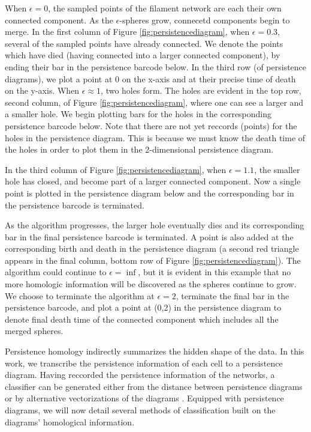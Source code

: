 \documentclass[10pt]{article}
\begin{document}
When $\epsilon=0$, the sampled points of the filament network are each their own connected component. As the $\epsilon$-spheres grow, connecetd components begin to merge. In the first column of Figure \ref{fig:persistencediagram}, when $\epsilon=0.3$, several of the sampled points have already connected. We denote the points which have died (having connected into a larger connected component), by ending their bar in the persistence barcode below. In the third row (of persistence diagrams), we plot a point at 0 on the x-axis and at their precise time of death on the y-axis. When $\epsilon\approx1$, two holes form. The holes are evident in the top row, second column, of Figure \ref{fig:persistencediagram}, where one can see a larger and a smaller hole. We begin plotting bars for the holes in the corresponding persistence barcode below. Note that there are not yet reccords (points) for the holes in the persistence diagram. This is because we must know the death time of the holes in order to plot them in the 2-dimensional persistence diagram. 

In the third column of Figure \ref{fig:persistencediagram}, when $\epsilon=1.1$, the smaller hole has closed, and become part of a larger connected component. Now a single point is plotted in the persistence diagram below and the corresponding bar in the persistence barcode is terminated.

As the algorithm progresses, the larger hole eventually dies and its corresponding bar in the final persistence barcode is terminated. A point is also added at the corresponding birth and death in the persistence diagram (a second red triangle appears in the final column, bottom row of Figure \ref{fig:persistencediagram}). The algorithm could continue to $\epsilon=\inf$, but it is evident in this example that no more homologic information will be discovered as the spheres continue to grow. We choose to terminate the algorithm at $\epsilon=2$, terminate the final bar in the persistence barcode, and plot a point at (0,2) in the persistence diagram to denote final death time of the connected component which includes all the merged spheres.

Persistence homology indirectly summarizes the hidden shape of the data. In this work, we transcribe the persistence information of each cell to a persistence diagram. Having reccorded the persistence information of the networks, a classifier can be generated either from the distance \cite{marchese2018signal} between persistence diagrams or by alternative vectorizations of the diagrams \cite{adams2017persistence,bubenik2015statistical,maroulas2018stable}. Equipped with persistence diagrams, we will now detail several methods of classification built on the diagrams' homological information.












\clearpage	


\end{document}
